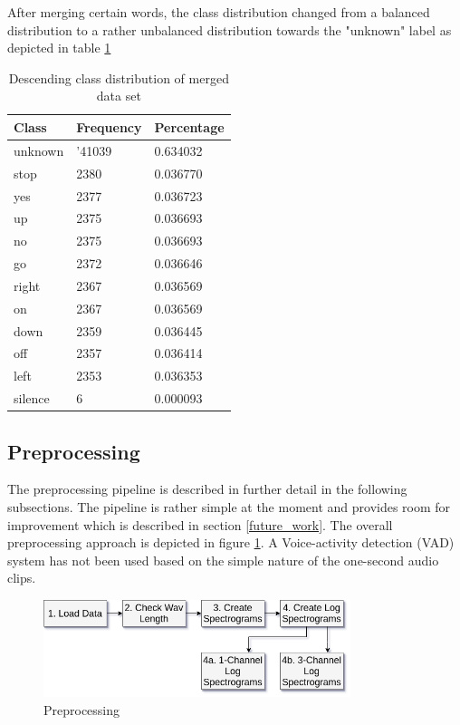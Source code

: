 \documentclass{article}
\theoremstyle{definition}
\theoremstyle{remark}
\begin{document}
After merging  certain words, the class distribution changed from a balanced distribution to a rather unbalanced distribution towards the "unknown" label as depicted in table \ref{tab:class_distribution}


\begin{table}[h!]
\center
\begin{tabular}{|l|l|l|}
\hline
Class & Frequency & Percentage \\ \hline
unknown & '41039 & 0.634032  \\ \hline
stop & 2380 & 0.036770 \\ \hline
yes & 2377 & 0.036723  \\ \hline
up & 2375 &  0.036693\\ \hline
no & 2375 & 0.036693 \\ \hline
go & 2372 & 0.036646 \\ \hline
right & 2367 & 0.036569 \\ \hline
on & 2367 & 0.036569 \\ \hline
down & 2359 & 0.036445 \\ \hline
off & 2357 & 0.036414 \\ \hline
left & 2353 & 0.036353\\ \hline
silence & 6 & 0.000093\\ \hline
\end{tabular}
\caption{Descending class distribution of merged data set}
\label{tab:class_distribution}
\end{table}

		
		
		
		
		
		
		
		
		
		
		

\subsection{Preprocessing}

The preprocessing pipeline is described in further detail in the following subsections. The pipeline is rather simple at the moment and provides room for improvement which is described in section \ref{future_work}. The overall preprocessing approach is depicted in figure \ref{fig:preprocessing}. A Voice-activity detection (VAD) system 
has not been used based on the simple nature of the one-second audio clips.

\begin{figure}[h]
    \centering
    \includegraphics[width=0.8\textwidth]{img/preprocessing.png}
    \caption{Preprocessing}
    \label{fig:preprocessing}
\end{figure}
\end{document}
